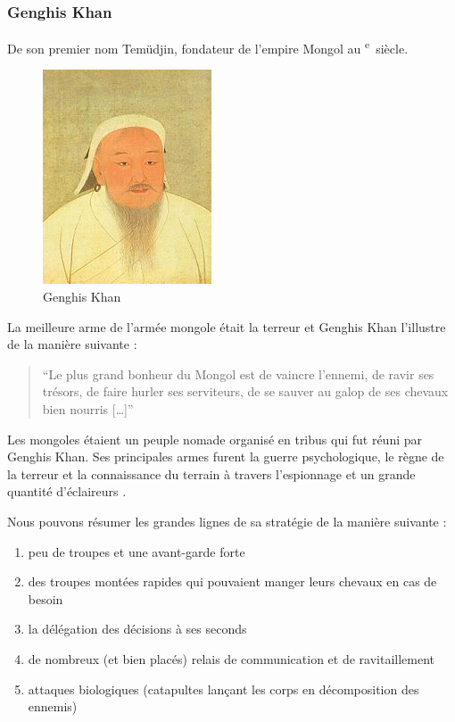 \documentclass{article}
\newcommand{\cRM}[1]{\MakeUppercase{\romannumeral #1}}  %
\newcommand{\siecle}[1]{\cRM{#1}\textsuperscript{e}~siècle}
\begin{document}
\subsubsection{Genghis Khan}
De son premier nom Temüdjin, fondateur de l'empire Mongol au \siecle{12}.
\begin{figure}[H]
	\begin{centering}
	\includegraphics[width=5cm]{../ressources/genghis_khan}
	\caption{Genghis Khan \cite{khan_wiki}}
	\end{centering}
\end{figure}
La meilleure arme de l'armée mongole était la terreur et Genghis Khan l'illustre de la manière suivante : \begin{quote}“Le plus grand bonheur du Mongol est de vaincre l’ennemi, de ravir ses trésors, de faire hurler ses serviteurs, de se sauver au galop de ses chevaux bien nourris [\ldots]”\end{quote}
Les mongoles étaient un peuple nomade organisé en tribus qui fut réuni par Genghis Khan. Ses principales armes furent la guerre psychologique, le règne de la terreur et la connaissance du terrain à travers l'espionnage et un grande quantité d'éclaireurs \cite{military_strategy}.

Nous pouvons résumer les grandes lignes de sa stratégie de la manière suivante \cite{mongol_army} :
\begin{enumerate}
\item peu de troupes et une avant-garde forte
\item des troupes montées rapides qui pouvaient manger leurs chevaux en cas de besoin
\item la délégation des décisions à ses seconds
\item de nombreux (et bien placés) relais de communication et de ravitaillement
\item attaques biologiques (catapultes lançant les corps en décomposition des ennemis)
\end{enumerate}
\end{document}
